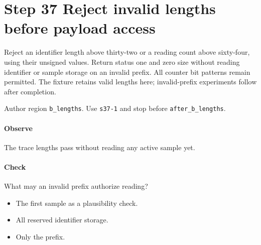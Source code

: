 \section{Step 37 Reject invalid lengths before payload access}\label{cbor-s37}
Reject an identifier length above thirty-two or a reading count above sixty-four, using their unsigned values. Return status one and zero size without reading identifier or sample storage on an invalid prefix. All counter bit patterns remain permitted. The fixture retains valid lengths here; invalid-prefix experiments follow after completion.

Author region \texttt{b\_lengths}. Use \texttt{s37-1} and stop before \texttt{after\_b\_lengths}.

\paragraph{Observe} The trace lengths pass without reading any active sample yet.

\paragraph{Check} What may an invalid prefix authorize reading?
\begin{itemize}
  \item[A.] The first sample as a plausibility check.
  \item[B.] All reserved identifier storage.
  \item[C.] Only the prefix.
\end{itemize}
